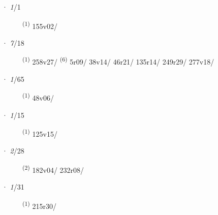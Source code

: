 \noindent{} · \textit{1}/1 \LEMMALINE
\begin{description}
    \item[]  \textsuperscript{(1)} \mbox{155v02/}
\end{description}
\ENTRYEND
\noindent{} · \textit{7}/18 \LEMMALINE
\begin{description}
    \item[]  \textsuperscript{(1)} \mbox{258v27/} \CASEBREAK {} \textsuperscript{(6)} \mbox{5r09/} \mbox{38v14/} \mbox{46r21/} \mbox{135r14/} \mbox{249r29/} \mbox{277v18/}
\end{description}
\ENTRYEND
\noindent{} · \textit{1}/65 \LEMMALINE
\begin{description}
    \item[]  \textsuperscript{(1)} \mbox{48v06/}
\end{description}
\ENTRYEND
\noindent{} · \textit{1}/15 \LEMMALINE
\begin{description}
    \item[]  \textsuperscript{(1)} \mbox{125v15/}
\end{description}
\ENTRYEND
\noindent{} · \textit{2}/28 \LEMMALINE
\begin{description}
    \item[]  \textsuperscript{(2)} \mbox{182v04/} \mbox{232r08/}
\end{description}
\ENTRYEND
\noindent{} · \textit{1}/31 \LEMMALINE
\begin{description}
    \item[]  \textsuperscript{(1)} \mbox{215r30/}
\end{description}
